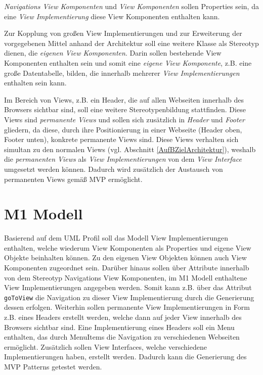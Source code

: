 \textit{Navigations View Komponenten} und \textit{View Komponenten} sollen 
Properties sein, da eine \textit{View Implementierung} diese View Komponenten
enthalten kann.

Zur Kopplung von großen View Implementierungen und zur Erweiterung der
vorgegebenen Mittel anhand der Architektur soll eine weitere Klasse als Stereotyp dienen, die
\textit{eigenen View Komponenten}. Darin sollen bestehende View Komponenten
enthalten sein und somit eine \textit{eigene View Komponente}, z.B. eine große
Datentabelle, bilden, die innerhalb mehrerer \textit{View Implementierungen}
enthalten sein kann.

Im Bereich von Views, z.B. ein Header, die auf allen Webseiten innerhalb des
Browsers sichtbar sind, soll eine weitere Stereotypenbildung stattfinden. Diese Views
sind \textit{permanente Views} und sollen sich zusätzlich in \textit{Header} und
\textit{Footer} gliedern, da diese, durch
ihre Positionierung in einer Webseite (Header oben, Footer unten), konkrete
permanente Views sind. Diese Views verhalten sich simultan zu den normalen Views (vgl. Abschnitt \ref{AufBZielArchitektur}),
weshalb die \textit{permanenten Views} als \textit{View Implementierungen} von
dem \textit{View Interface} umgesetzt werden können.
Dadurch wird zusätzlich der Austausch von permanenten Views gemäß MVP
ermöglicht.
\section{M1 Modell}\label{AufBM1}
Basierend auf dem UML Profil soll das Modell View Implementierungen enthalten,
welche wiederum View Komponenten als Properties und eigene
View Objekte beinhalten können. Zu den eigenen View Objekten können auch View
Komponenten zugeordnet sein.
Darüber hinaus sollen über Attribute innerhalb von dem Stereotyp Navigations View Komponenten,
im M1 Modell enthaltene View Implementierungen angegeben werden. Somit kann z.B.
über das Attribut \texttt{goToView} die Navigation zu dieser View
Implementierung durch die Generierung dessen erfolgen.
Weiterhin sollen permanente View Implementierungen in Form z.B. eines
Headers erstellt werden, welche dann auf jeder View innerhalb des Browsers
sichtbar sind. Eine Implementierung eines Headers soll ein Menu enthalten,
das durch MenuItems die Navigation zu verschiedenen Webseiten ermöglicht.
Zusätzlich sollen View Interfaces, welche verschiedene
Implementierungen haben, erstellt werden. Dadurch kann die Generierung des
MVP Patterns getestet werden.
